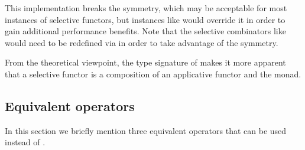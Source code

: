 \noindent
This implementation breaks the symmetry, which may be acceptable for most
instances of selective functors, but instances like  would override it
in order to gain additional performance benefits. Note that the selective
combinators like \hs{<||>} would need to be redefined via  in order
to take advantage of the symmetry.

From the theoretical viewpoint, the type signature of  makes it
more apparent that a selective functor  is a composition of an applicative
functor  and the  monad.

\subsection{Equivalent operators}\label{sec-alt-equivalent}

In this section we briefly mention three equivalent operators that can be used
instead of .

